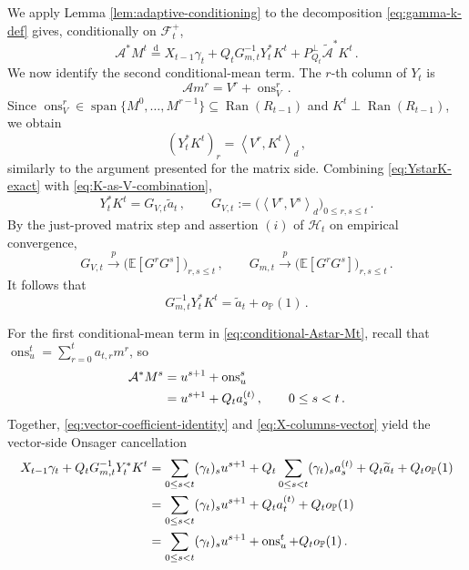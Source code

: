 \documentclass[11pt]{article}
\theoremstyle{definition}
\theoremstyle{remark}
\numberwithin{equation}{section}
\numberwithin{theorem}{section}
\newcommand{\E}{\mathbb E}
\newcommand{\Prob}{\mathbb P}
\newcommand{\Span}{\operatorname{span}}
\newcommand{\ip}[2]{\left\langle #1,#2\right\rangle}
\newcommand{\cA}{\mathcal A}
\newcommand{\ons}{\operatorname{ons}}
\newcommand{\xto}{\xrightarrow}
\begin{document}
We apply Lemma \ref{lem:adaptive-conditioning} to the decomposition \eqref{eq:gamma-k-def} gives, conditionally on $\mathcal F_t^+$,
\begin{equation}\label{eq:conditional-Astar-Mt}
  \cA^* M^t
  \overset{\mathrm d}{=}
  X_{t-1}\gamma_t
  +Q_tG_{m,t}^{-1}Y_t^*K^t
  +P_{Q_t}^\perp\widetilde{\cA}^*K^t\,.
\end{equation}
We now identify the second conditional-mean term.  The $r$-th column of $Y_t$ is
\[
  \cA m^r=V^r+\ons_V^r\,.
\]
Since $\ons_V^r\in\Span\{M^0,\ldots,M^{r-1}\}\subseteq\operatorname{Ran}(R_{t-1})$ and $K^t\perp\operatorname{Ran}(R_{t-1})$, we obtain
\begin{equation}\label{eq:YstarK-exact}
  (Y_t^*K^t)_r
  =\ip{V^r}{K^t}_d\,,
\end{equation}
similarly to the argument presented for the matrix side. 
Combining \eqref{eq:YstarK-exact} with \eqref{eq:K-as-V-combination},
\begin{equation}\label{eq:YstarK-GramV}
  Y_t^*K^t
  =G_{V,t}\widetilde{a}_t\,,
  \qquad
  G_{V,t}:=\bigl(\ip{V^r}{V^s}_d\bigr)_{0\le r,s\le t}\,.
\end{equation}
By the just-proved matrix step and assertion $(i)$ of $\mathcal{H}_t$ on empirical convergence,
\[
  G_{V,t}\xto{p}
  \bigl(\E[G^rG^s]\bigr)_{r,s\le t}\,,
  \qquad
  G_{m,t}\xto{p}
  \bigl(\E[G^rG^s]\bigr)_{r,s\le t}\,.
\]
It follows that
\begin{equation}\label{eq:vector-coefficient-identity}
  G_{m,t}^{-1}Y_t^*K^t
  =\widetilde{a}_t + o_{\Prob}(1)\,.
\end{equation}

For the first conditional-mean term in \eqref{eq:conditional-Astar-Mt}, recall that $\ons_u^t =\sum_{r=0}^{t} a_{t,r} m^r$, so
\begin{align}
  \cA^* M^s &= u^{s+1} + \ons_u^s \notag\\
  &=u^{s+1} + Q_t a_s^{(t)}\,,
  \qquad 0\le s<t\,.\label{eq:X-columns-vector}
\end{align}
Together, \eqref{eq:vector-coefficient-identity} and \eqref{eq:X-columns-vector} yield the vector-side Onsager cancellation
\begin{align}
  X_{t-1}\gamma_t
  +Q_tG_{m,t}^{-1}Y_t^*K^t
  &=\sum_{0\le s<t}(\gamma_t)_s u^{s+1}
    +Q_t\sum_{0\le s<t}(\gamma_t)_s a_s^{(t)}
    +Q_t\widetilde{a}_t
    +Q_t o_{\Prob}(1) \notag\\
  &=\sum_{0\le s<t}(\gamma_t)_su^{s+1}
    +Q_t a_t^{(t)}+ Q_t o_{\Prob}(1) \notag\\
  &=\sum_{0\le s<t}(\gamma_t)_su^{s+1}
    +\ons_u^t+Q_t o_{\Prob}(1)\,.
  \label{eq:combined-conditional-mean-vector}
\end{align}
\end{document}
